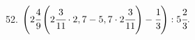 52. $\left(2\cfrac{4}{9}\left(2\cfrac{3}{11}\cdot2,7-5,7\cdot2\cfrac{3}{11}\right)-\cfrac{1}{3}\right):5\cfrac{2}{3}.$\quad
